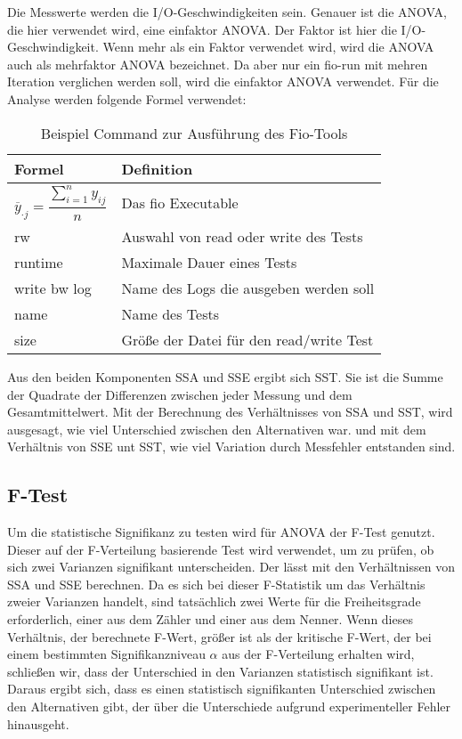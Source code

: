Die Messwerte werden die I/O-Geschwindigkeiten sein. Genauer ist die ANOVA, die hier verwendet wird, eine einfaktor ANOVA.
Der Faktor ist hier die I/O-Geschwindigkeit. Wenn mehr als ein Faktor verwendet wird, wird die ANOVA auch als mehrfaktor ANOVA bezeichnet.
Da aber nur ein fio-run mit mehren Iteration verglichen werden soll, wird die einfaktor ANOVA verwendet.
Für die Analyse werden folgende Formel verwendet:

\begin{center}
  \begin{table}[h!]
    \begin{tabularx}{\textwidth}{|X|X|}
      \hline
        Formel & Definition \\ 
      \hline
      $\overline{y}_{\cdot j} = \dfrac{\sum_{i=1}^{n} y_{ij}}{n}$ & Das fio Executable  \\ 
      rw & Auswahl von read oder write des Tests  \\ 
      \hline
      runtime & Maximale Dauer eines Tests  \\ 
      \hline
      write bw log &  Name des Logs die ausgeben werden soll   \\ 
      \hline
      name &  Name des Tests   \\ 
      \hline
      size & Größe der Datei für den read/write Test    \\ 
      \hline
    \end{tabularx}
    \caption{Beispiel Command zur Ausführung des Fio-Tools}
    \label{tab:formel_mittelwerte}
  \end{table}
\end{center}

Aus den beiden Komponenten SSA und SSE ergibt sich SST.
Sie ist die Summe der Quadrate der Differenzen zwischen jeder Messung und dem Gesamtmittelwert.
Mit der Berechnung des Verhältnisses von SSA und SST, wird ausgesagt, wie viel Unterschied zwischen den Alternativen war.
und mit dem Verhältnis von SSE unt SST, wie viel Variation durch Messfehler entstanden sind.  

\subsection{F-Test}
Um die statistische Signifikanz zu testen wird für ANOVA der F-Test genutzt.
Dieser auf der F-Verteilung basierende Test wird verwendet, um zu prüfen, ob sich zwei Varianzen signifikant unterscheiden.
Der lässt mit den Verhältnissen von SSA und SSE berechnen.
Da es sich bei dieser F-Statistik um das Verhältnis zweier Varianzen handelt, sind tatsächlich zwei Werte für die Freiheitsgrade erforderlich, 
einer aus dem Zähler und einer aus dem Nenner.
Wenn dieses Verhältnis, der berechnete F-Wert, größer ist als der kritische F-Wert, der bei einem bestimmten Signifikanzniveau $\alpha$ aus der F-Verteilung erhalten wird, 
schließen wir, dass der Unterschied in den Varianzen statistisch signifikant ist. Daraus ergibt sich, 
dass es einen statistisch signifikanten Unterschied zwischen den Alternativen gibt, der über die Unterschiede aufgrund experimenteller Fehler hinausgeht.

